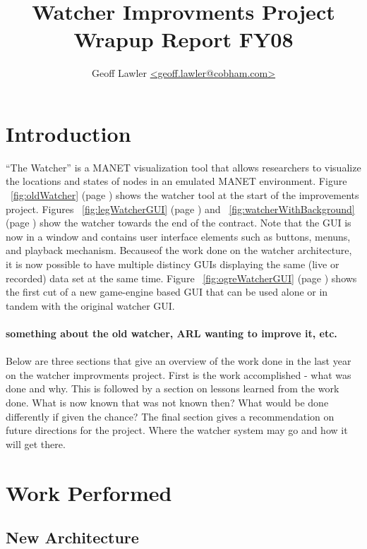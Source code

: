 \documentclass{report}
\author{Geoff Lawler \url{<geoff.lawler@cobham.com>}}
\title{{\bf Watcher Improvments Project}\\Wrapup Report FY08}
\begin{document}
\maketitle

\renewcommand*\thesection{\arabic{section}}

\section{Introduction}

``The Watcher'' is a MANET visualization tool that allows researchers to visualize the locations and states of nodes in an emulated MANET environment. 
Figure ~\ref{fig:oldWatcher} (page \pageref{fig:oldWatcher}) shows the watcher tool at the start of the improvements project. Figures ~\ref{fig:legWatcherGUI} (page \pageref{fig:legWatcherGUI}) and ~\ref{fig:watcherWithBackground}
(page \pageref{fig:watcherWithBackground}) show the watcher towards the end of the contract. Note that the GUI is now in a window and contains user interface elements such as buttons, menuns, and playback
mechanism. Becauseof the work done on the watcher architecture, it is now possible to have multiple distincy GUIs displaying the same (live or recorded) data 
set at the same time. Figure ~\ref{fig:ogreWatcherGUI} (page \pageref{fig:ogreWatcherGUI}) shows the first cut of a new game-engine based GUI that can be used alone or in tandem with the original watcher GUI. 
\\\\
{\bf something about the old watcher, ARL wanting to improve it, etc. }
\\\\
Below are three sections that give an overview of the work done in the last year on the watcher improvments project. First
is the work accomplished - what was done and why. This is followed by a section on lessons learned from the work done. What is now known 
that was not known then? What would be done differently if given the chance? The final section gives a recommendation on future directions
for the project. Where the watcher system may go and how it will get there. 

\section{Work Performed}
\subsection{New Architecture}
\end{document}
